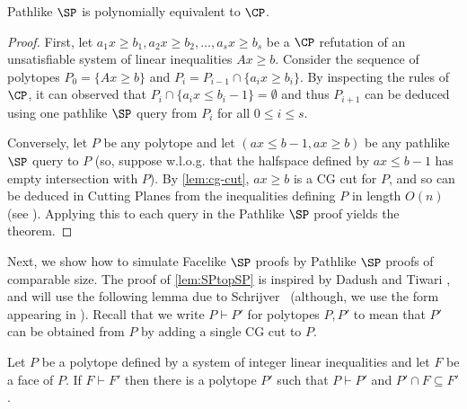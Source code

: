 \documentclass{toc}
\begin{document}
\begin{theorem}\label{lem:pathsp-cp}
	 Pathlike $\SP$ is polynomially equivalent to $\CP$. 	
\end{theorem}
\begin{proof}
	First, let $a_1x \geq b_1, a_2x \geq b_2, \ldots, a_sx \geq b_s$ be a $\CP$ refutation of an unsatisfiable system of linear inequalities $Ax \geq b$. 
	Consider the sequence of polytopes $P_0 =\{Ax \geq b\}$ and $P_i = P_{i-1} \cap \{a_i x \geq b_i\}$. 
	By inspecting the rules of $\CP$, it can observed that $P_i \cap \{a_ix \leq b_i-1\}= \emptyset$ and thus $P_{i+1}$ can be deduced using one pathlike $\SP$ query from $P_i$ for all $0 \leq i \leq s$.
	
	Conversely, let $P$ be any polytope and let $(ax \leq b-1, ax \geq b)$ be any pathlike $\SP$ query to $P$ (so, suppose w.l.o.g. that the halfspace defined by $ax \leq b-1$ has empty intersection with $P$).
	By \autoref{lem:cg-cut}, $ax \geq b$ is a CG cut for $P$, and so can be deduced in Cutting Planes from the inequalities defining $P$ in length $O(n)$
%
(see ).    %
	Applying this to each query in the Pathlike $\SP$ proof yields the theorem.
%
%
%
%
%
%
\end{proof}
	Next, we show how to simulate Facelike $\SP$ proofs by Pathlike $\SP$ proofs of comparable size.
	The proof of \autoref{lem:SPtopSP} is inspired by Dadush and Tiwari \cite{TseitinUpperBound}, and will use the following lemma due to Schrijver~\cite{SCHRIJVER1980291} (although, we use the form appearing in \cite{CookCT87}).
	Recall that we write $P \vdash P'$ for polytopes $P, P'$ to mean that $P'$ can be obtained from $P$ by adding a single CG cut to $P$.
	\begin{theorem}
	\label{lem:shrijver}
		Let $P$ be a polytope defined by a system of integer linear inequalities and let $F$ be a face of $P$. 
		If $F \vdash F'$ then there is a polytope $P'$ such that $P \vdash P'$ and $P' \cap F \subseteq F'$.
	\end{theorem}
	
\end{document}
